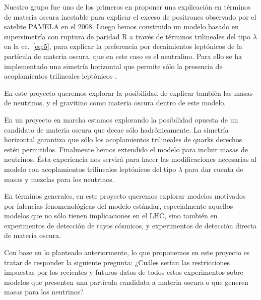 Nuestro grupo \cite{Nardi:2008ix} fue uno de los primeros en proponer
una explicación en términos de materia oscura inestable para explicar
el exceso de positrones observado por el satelite PAMELA en el
2008\cite{Adriani:2008zr}. Luego hemos construido un modelo basado en
supersimetría con ruptura de paridad R a través de términos
trilineales del tipo $\lambda$ en la ec.~\eqref{eq:5}, para explicar
la preferencia por decaimientos leptónicos de la partícula de materia
oscura, que en este caso es el neutralino. Para ello se ha
implementado una simetría horizontal que permite sólo la presencia de
acoplamientos trilineales leptónicos \cite{Sierra:2009zq}. 
\begin{proyecto}
  En este proyecto queremos explorar la posibilidad de explicar
  también las masas de neutrinos, y el gravitino como materia oscura
  dentro de este modelo.
\end{proyecto}
 En un proyecto en marcha estamos explorando la posibilidad
opuesta de un candidato de materia oscura que decae sólo
hadrónicamente. La simetría horizontal garantiza que sólo los
acoplamientos trilineales de quarks derechos estén
permitidos. Finalmente hemos extendido el modelo para incluir masas de
neutrinos. Ésta experiencia nos servirá para hacer las modificaciones
necesarias al modelo con acoplamientos trilineales leptónicos del tipo
$\lambda$ para dar cuenta de masas y mezclas para los neutrinos. 

\begin{proyecto}
  En términos generales, en este proyecto queremos explorar modelos
  motivados por falencias fenomenológicas del modelo estándar,
  especialmente aquellos modelos que no sólo tienen implicaciones en
  el LHC, sino también en experimentos de detección de rayos cósmicos,
  y experimentos de detección directa de materia oscura.
\end{proyecto}




\begin{proyecto}
  Con base en lo planteado anteriormente, lo que proponemos en este
  proyecto es tratar de responder la siguiente pregunta: ¿Cuáles
  serían las restricciones impuestas por los recientes y futuros datos
  de todos estos experimentos sobre modelos que presenten una
  partícula candidata a materia oscura o que generen masas para los
  neutrinos?
\end{proyecto}







